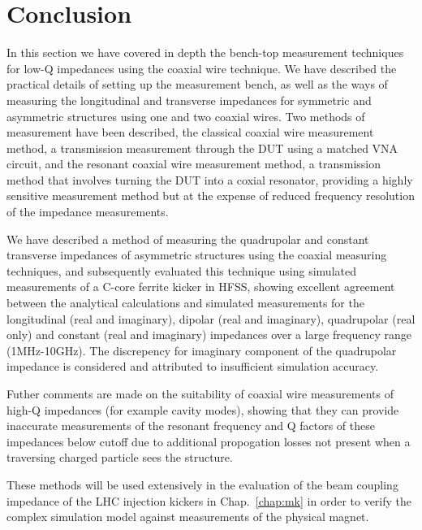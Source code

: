 \section{Conclusion}

In this section we have covered in depth the bench-top measurement techniques for low-Q impedances using the coaxial wire technique. We have described the practical details of setting up the measurement bench, as well as the ways of measuring the longitudinal and transverse impedances for symmetric and asymmetric structures using one and two coaxial wires. Two methods of measurement have been described, the classical coaxial wire measurement method, a transmission measurement through the DUT using a matched VNA circuit, and the resonant coaxial wire measurement method, a transmission method that involves turning the DUT into a coxial resonator, providing a highly sensitive measurement method but at the expense of reduced frequency resolution of the impedance measurements.

We have described a method of measuring the quadrupolar and constant transverse impedances of asymmetric structures using the coaxial measuring techniques, and subsequently evaluated this technique using simulated measurements of a C-core ferrite kicker in HFSS, showing excellent agreement between the analytical calculations and simulated measurements for the longitudinal (real and imaginary), dipolar (real and imaginary), quadrupolar (real only) and constant (real and imaginary) impedances over a large frequency range (1MHz-10GHz). The discrepency for imaginary component of the quadrupolar impedance is considered and attributed to insufficient simulation accuracy.

Futher comments are made on the suitability of coaxial wire measurements of high-Q impedances (for example cavity modes), showing that they can provide inaccurate measurements of the resonant frequency and Q factors of these impedances below cutoff due to additional propogation losses not present when a traversing charged particle sees the structure.

These methods will be used extensively in the evaluation of the beam coupling impedance of the LHC injection kickers in Chap.~\ref{chap:mk} in order to verify the complex simulation model against measurements of the physical magnet.